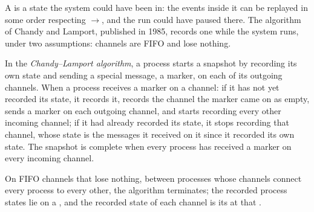 A  is a state the system could have been in: the events inside it can be replayed in some order respecting $\to$, and the run could have paused there. The algorithm of Chandy and Lamport, published in 1985, records one while the system runs, under two assumptions: channels are FIFO and lose nothing. %

\begin{definition}\label{def:b3:distributed-systems:chandy-lamport}
In the \emph{Chandy--Lamport algorithm}, a process starts a snapshot by recording its own state and sending a special message, a marker, on each of its outgoing channels. When a process receives a marker on a channel: if it has not yet recorded its state, it records it, records the channel the marker came on as empty, sends a marker on each outgoing channel, and starts recording every other incoming channel; if it had already recorded its state, it stops recording that channel, whose state is the messages it received on it since it recorded its own state. The snapshot is complete when every process has received a marker on every incoming channel.
\end{definition}

\begin{theorem}\label{thm:b3:distributed-systems:chandy-lamport}
On FIFO channels that lose nothing, between processes whose channels connect every process to every other, the algorithm terminates; the recorded process states lie on a , and the recorded state of each channel is its  at that .
\end{theorem}

